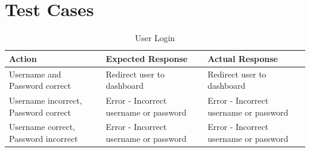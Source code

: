 \documentclass[12pt,a4paper]{report}
\begin{document}
\newpage
\chapter{Test Cases}\label{cha:test_cases}
\begin{table}[H]
	\raggedright
	\centering
	\caption{User Login}
	\begin{tabular}{|p{}|p{}|p{}|}
		\hline
		Action                               & Expected Response                      & Actual Response                        \\
		\hline
		Username and Password correct        & Redirect user to dashboard             & Redirect user to dashboard             \\
		\hline
		Username incorrect, Password correct & Error - Incorrect username or password & Error - Incorrect username or password \\
		\hline
		Username correct, Password incorrect & Error - Incorrect username or password & Error - Incorrect username or password \\
		\hline
	\end{tabular}
\end{table}
\end{document}
